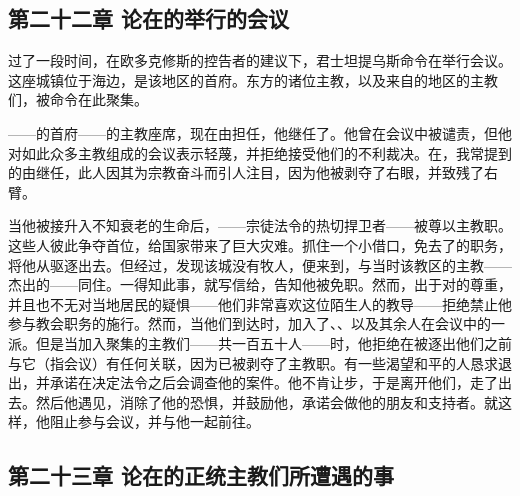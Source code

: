 
\subsection{第二十二章 论在的举行的会议}

过了一段时间，在欧多克修斯的控告者的建议下，君士坦提乌斯命令在举行会议。这座城镇位于海边，是该地区的首府。东方的诸位主教，以及来自的地区的主教们，被命令在此聚集。\par

——的首府——的主教座席，现在由担任，他继任了。他曾在会议中被谴责，但他对如此众多主教组成的会议表示轻蔑，并拒绝接受他们的不利裁决。在，我常提到的由继任，此人因其为宗教奋斗而引人注目，因为他被剥夺了右眼，并致残了右臂。\par

当他被接升入不知衰老的生命后，——宗徒法令的热切捍卫者——被尊以主教职。这些人彼此争夺首位，给国家带来了巨大灾难。抓住一个小借口，免去了的职务，将他从驱逐出去。但经过，发现该城没有牧人，便来到，与当时该教区的主教——杰出的——同住。一得知此事，就写信给，告知他被免职。然而，出于对的尊重，并且也不无对当地居民的疑惧——他们非常喜欢这位陌生人的教导——拒绝禁止他参与教会职务的施行。然而，当他们到达时，加入了、、以及其余人在会议中的一派。但是当加入聚集的主教们——共一百五十人——时，他拒绝在被逐出他们之前与它（指会议）有任何关联，因为已被剥夺了主教职。有一些渴望和平的人恳求退出，并承诺在决定法令之后会调查他的案件。他不肯让步，于是离开他们，走了出去。然后他遇见，消除了他的恐惧，并鼓励他，承诺会做他的朋友和支持者。就这样，他阻止参与会议，并与他一起前往。\par


\subsection{第二十三章 论在的正统主教们所遭遇的事}

